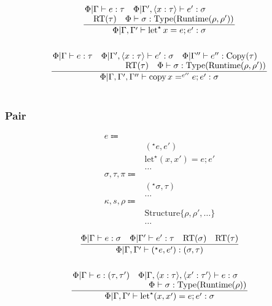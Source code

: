 \documentclass {article}
\begin{document}
\begin{gather*}
\frac
{\splitfrac{ \Phi | \Gamma \vdash e : \tau \quad \Phi | \Gamma', \langle x : \tau \rangle \vdash e' : \sigma}
{\text{RT}(\tau) \quad \Phi \vdash \sigma : \text{Type}(\text{Runtime}(\rho, \rho')) }}
{\Phi | \Gamma, \Gamma' \vdash \text{let}^\star \, x = e; e' : \sigma} \\
\\
\frac
{\splitfrac{ \Phi | \Gamma \vdash e : \tau \quad \Phi | \Gamma', \langle x : \tau \rangle \vdash e' : \sigma \quad \Phi | \Gamma'' \vdash e'' : \text{Copy}(\tau)}
{\text{RT}(\tau) \quad \Phi \vdash \sigma : \text{Type}(\text{Runtime}(\rho, \rho')) }}
{\Phi | \Gamma, \Gamma', \Gamma'' \vdash \text{copy} \, x =^{e''} e; e' : \sigma} \\
\end{gather*}

\begin{gather*}
\end{gather*}


\subsubsection{Pair}
\begin{align*}
e \Coloneqq & \\
& (^\star e, e') \tag{Runtime Pair Introduction} \\
& \text{let}^\star (x, x') = e; e' \tag{Runtime Pair Elimination} \\
& \dots \\
\sigma, \tau, \pi \Coloneqq & \\
& (^\star \sigma, \tau) \tag{Runtime Pair} \\
& \dots \\
\kappa, s, \rho \Coloneqq & \\
& \text{Structure} \{ \rho, \rho', \dots \} \tag{Structure Representation} \\
& \dots
\end{align*}

\begin{gather*}
\frac
{\Phi | \Gamma \vdash e : \sigma \quad \Phi | \Gamma' \vdash e' : \tau \quad \text{RT}(\sigma) \quad \text{RT}(\tau) }
{\Phi | \Gamma, \Gamma' \vdash (^\star e, e') : (\sigma, \tau) } \\
\\
\frac
{\splitfrac{\Phi | \Gamma \vdash e : (\tau, \tau') \quad \Phi | \Gamma , \langle x : \tau \rangle, \langle x' : \tau' \rangle \vdash e : \sigma  }
{\Phi \vdash \sigma : \text{Type} (\text{Runtime} (\rho)) }}
{\Phi | \Gamma, \Gamma' \vdash \text{let}^\star (x, x') = e; e' : \sigma}
\end{gather*}
\end{document}

